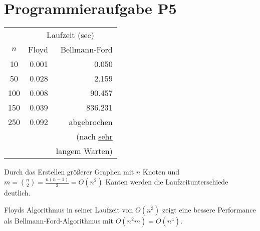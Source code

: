 \documentclass[11pt]{scrartcl} %
\begin{document}
\section*{Programmieraufgabe P5}
\begin{minipage}[h]{0.4\textwidth}
\begin{tabular}{c|r|r}
 & \multicolumn{2}{c}{Laufzeit (sec)}\\
$n$ & Floyd & Bellmann-Ford\\
\hline \hline
10 & 0.001 & 0.050\\
\hline
50 & 0.028 & 2.159 \\
\hline
100 & 0.008 & 90.457 \\
\hline
150 & 0.039 & 836.231 \\
\hline
250 & 0.092 & abgebrochen\\
& & \scriptsize{(nach \underline{sehr}}\\
& & \scriptsize{langem Warten)}\\
\hline
\end{tabular}
\end{minipage}
\begin{minipage}[h]{0.6\textwidth}
Durch das Erstellen größerer Graphen mit $n$ Knoten und $m=\binom{n}{2}=\frac{n(n-1)}{2}=O(n^2)$ Kanten werden die Laufzeitunterschiede deutlich. 

Floyds Algorithmus in seiner Laufzeit von $O(n^3)$ zeigt eine bessere Performance als Bellmann-Ford-Algorithmus mit $O(n^2m)=O(n^4)$. 
\end{minipage}
\end{document}
